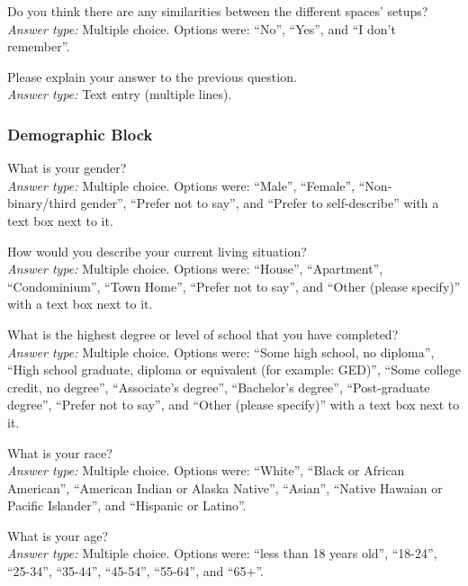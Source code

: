 Do you think there are any similarities between the different spaces' setups? \\
\textit{Answer type:} Multiple choice. Options were: ``No'', ``Yes'', and ``I don't remember''.

 Please explain your answer to the previous question. \\
\textit{Answer type:} Text entry (multiple lines).

\subsubsection{Demographic Block}
\label{appdx:survey:demographics}

\printQcounter{} What is your gender? \\
\textit{Answer type:} Multiple choice. Options were: ``Male'', ``Female'', ``Non-binary/third gender'', ``Prefer not to say'', and ``Prefer to self-describe'' with a text box next to it.

\printQcounter{} How would you describe your current living situation? \\
\textit{Answer type:} Multiple choice. Options were: ``House'', ``Apartment'', ``Condominium'', ``Town Home'', ``Prefer not to say'', and ``Other (please specify)'' with a text box next to it.

\printQcounter{} What is the highest degree or level of school that you have completed? \\
\textit{Answer type:} Multiple choice. Options were: ``Some high school, no diploma'', ``High school graduate, diploma or equivalent (for example: GED)'', ``Some college credit, no degree'', ``Associate's degree'', ``Bachelor's degree'', ``Post-graduate degree'', ``Prefer not to say'', and ``Other (please specify)'' with a text box next to it.

\printQcounter{} What is your race? \\
\textit{Answer type:} Multiple choice. Options were: ``White'', ``Black or African American'', ``American Indian or Alaska Native'', ``Asian'', ``Native Hawaian or Pacific Islander'', and ``Hispanic or Latino''.

\printQcounter{} What is your age? \\
\textit{Answer type:} Multiple choice. Options were: ``less than 18 years old'', ``18-24'', ``25-34'', ``35-44'', ``45-54'', ``55-64'', and ``65+''.

